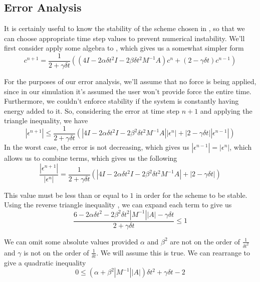 \subsection{Error Analysis}
It is certainly useful to know the stability of the scheme chosen in \label{eq:finite_diff_solution}, so that we can
choose appropriate time step values to prevent numerical instability. We'll first consider apply some algebra to
\label{eq:finite_diff_solution}, which gives us a somewhat simpler form
\begin{equation}
c^{n+1} = 
\frac{1}{2 + \gamma\delta t}
\left(
    \left( 4I - 2\alpha\delta t^2I - 2\beta\delta t^2M^{-1}A \right) c^n
    +
    \left( 2 - \gamma\delta t \right) c^{n-1}
\right)
\end{equation}

For the purposes of our error analysis, we'll assume that no force is being applied, since in our simulation it's
assumed the user won't provide force the entire time. Furthermore, we couldn't enforce stability if the system is
constantly having energy added to it. So, considering the error at time step $n+1$ and applying the triangle
inequality, we have
\begin{equation}
|\epsilon^{n+1}|
\le
\frac{1}{2 + \gamma\delta t}
\left(
    |4I - 2\alpha\delta t^2I - 2\beta^2\delta t^2M^{-1}A| |\epsilon^n|
    +
    |2 - \gamma\delta t| |\epsilon^{n-1}| 
\right)
\end{equation}
In the worst case, the error is not decreasing, which gives us $|\epsilon^{n-1}| = |\epsilon^n|$, which allows us to
combine terms, which gives us the following
\begin{equation}
\frac{|\epsilon^{n+1}|}{|\epsilon^n|}
=
\frac{1}{2 + \gamma\delta t} \left(
|4I - 2\alpha\delta t^2I - 2\beta^2\delta t^2M^{-1}A| + |2 - \gamma\delta t|
\right)
\end{equation}

This value must be less than or equal to $1$ in order for the scheme to be stable. Using the reverse triangle
inequality \cite{reverse_triangle_inequality}, we can expand each term to give us
\begin{equation}
\frac{6 - 2\alpha\delta t^2 - 2\beta^2 \delta t^2 |M^{-1}| |A| - \gamma\delta t}{2 + \gamma\delta t} \le 1
\end{equation}

We can omit some absolute values provided $\alpha$ and $\beta^2$ are not on the order of $\frac{1}{\delta t^2}$ and
$\gamma$ is not on the order of $\frac{1}{\delta t}$. We will assume this is true. We can rearrange to give a
quadratic inequality
\begin{equation}
0 \le \left(\alpha + \beta^2|M^{-1}| |A|\right)\delta t^2 + \gamma\delta t - 2
\end{equation}

